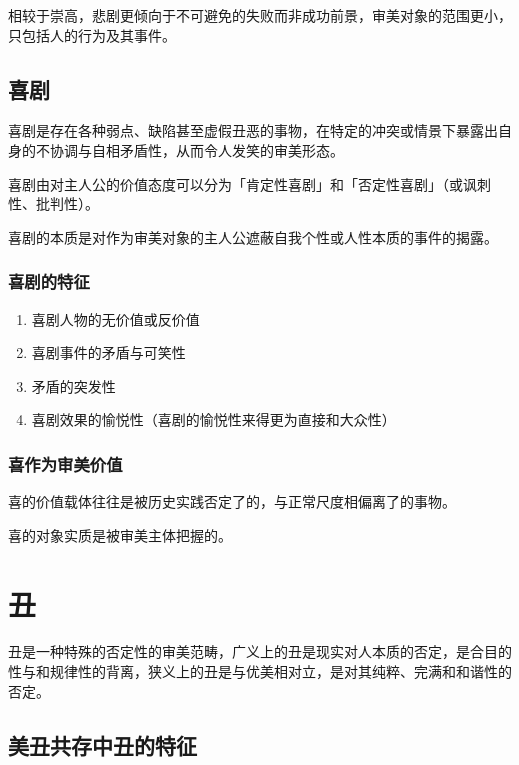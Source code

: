\documentclass{NoteThesis/note-thesis}
\begin{document}
相较于崇高，悲剧更倾向于不可避免的失败而非成功前景，审美对象的范围更小，只包括人的行为及其事件。

\subsection{喜剧}

喜剧是存在各种弱点、缺陷甚至虚假丑恶的事物，在特定的冲突或情景下暴露出自身的不协调与自相矛盾性，从而令人发笑的审美形态。

\begin{mynote_env}[frametitle={喜剧的类型}]
    喜剧由对主人公的价值态度可以分为「肯定性喜剧」和「否定性喜剧」（或讽刺性、批判性）。
\end{mynote_env}

\begin{mynote_env}[frametitle={喜剧的本质}]
    喜剧的本质是对作为审美对象的主人公遮蔽自我个性或人性本质的事件的揭露。
\end{mynote_env}

\subsubsection{喜剧的特征}

\begin{enumerate}
    \item 喜剧人物的无价值或反价值
    \item 喜剧事件的矛盾与可笑性
    \item 矛盾的突发性
    \item 喜剧效果的愉悦性（喜剧的愉悦性来得更为直接和大众性）
\end{enumerate}

\subsubsection*{喜作为审美价值}

喜的价值载体往往是被历史实践否定了的，与正常尺度相偏离了的事物。

喜的对象实质是被审美主体把握的。

\section{丑}

丑是一种特殊的否定性的审美范畴，广义上的丑是现实对人本质的否定，是合目的性与和规律性的背离，狭义上的丑是与优美相对立，是对其纯粹、完满和和谐性的否定。

\subsection{\texorpdfstring{\mbox{}}{} 美丑共存中丑的特征}
\end{document}
